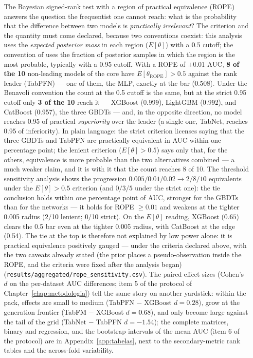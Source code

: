 The Bayesian signed-rank test with a region of practical equivalence
(ROPE) \citep{benavoli2017} answers the question the frequentist one
cannot reach: what is the probability that the difference between two
models is \emph{practically irrelevant}? The criterion and the
quantity must come declared, because two conventions coexist: this
analysis uses the \emph{expected posterior mass} in each region
($E[\theta]$) with a 0.5 cutoff; the convention of
\citet{benavoli2017} uses the fraction of posterior samples in which
the region is the most probable, typically with a 0.95 cutoff. With a
ROPE of $\pm$0.01 AUC, \textbf{8 of the 10} non-leading models of the
core have $E[\theta_{\mathrm{ROPE}}] > 0.5$ against the rank leader
(TabPFN) --- one of them, the MLP, exactly at the bar (0.508). Under
the Benavoli convention the count at the 0.5 cutoff is the same, but
at the strict 0.95 cutoff only \textbf{3 of the 10} reach it ---
XGBoost (0.999), LightGBM (0.992), and CatBoost (0.957), the three
GBDTs --- and, in the opposite direction, no model reaches 0.95 of
practical \emph{superiority} over the leader (a single one, TabNet,
reaches 0.95 of inferiority). In plain language: the strict criterion
licenses saying that the three GBDTs and TabPFN are practically
equivalent in AUC within one percentage point; the lenient criterion
($E[\theta]>0.5$) says only that, for the others, equivalence is more
probable than the two alternatives combined --- a much weaker claim,
and it is with it that the count reaches 8 of 10. The threshold
sensitivity analysis shows the progression
$0.005/0.01/0.02 \to 2/8/10$ equivalents under the $E[\theta]>0.5$
criterion (and $0/3/5$ under the strict one): the tie conclusion
holds within one percentage point of AUC, stronger for the GBDTs than
for the networks --- it holds for ROPE $\geq 0.01$ and weakens at
the tighter 0.005 radius (2/10 lenient; 0/10 strict). On the
$E[\theta]$ reading, XGBoost ($0.65$) clears
the 0.5 bar even at the tighter 0.005 radius, with CatBoost at the
edge (0.54). The tie at the top is therefore not explained by low
power alone: it is practical equivalence positively gauged --- under
the criteria declared above, with the two caveats already stated
(the prior places a pseudo-observation inside the ROPE, and the
criteria were fixed after the analysis began)
(\texttt{results/\allowbreak aggregated/\allowbreak rope\_\allowbreak sensitivity.csv}).
The paired effect sizes (Cohen's $d$ on the per-dataset AUC
differences; item 5 of the protocol of
Chapter~\ref{chap:metodologia}) tell the same story on another
yardstick: within the pack, effects are small to medium (TabPFN $-$
XGBoost $d{=}0.28$), grow at the generation frontier (TabFM $-$
XGBoost $d{=}0.68$), and only become large against the tail of the
grid (TabNet $-$ TabPFN $d{=}{-}1.54$); the complete matrices, binary
and regression, and the bootstrap intervals of the mean AUC (item 6
of the protocol) are in Appendix~\ref{app:tabelas}, next to the
secondary-metric rank tables and the across-fold variability.

